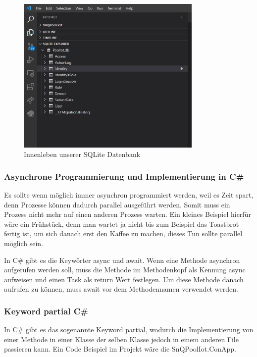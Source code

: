 \begin{figure}[H]
    \centering
    \includegraphics[width=0.8\textwidth]{./pics/SQLiteDatabaseStructure.JPG}
    \caption{Innenleben unserer SQLite Datenbank}
\end{figure}



\subsubsection*{Asynchrone Programmierung und Implementierung in C\#}
Es sollte wenn möglich immer asynchron programmiert werden, weil es Zeit spart, denn Prozesse können dadurch parallel ausgeführt werden.
Somit muss ein Prozess nicht mehr auf einen anderen Prozess warten.
Ein kleines Beispiel hierfür wäre ein Frühstück, denn man wartet ja nicht bis zum Beispiel das Toastbrot fertig ist, um sich danach erst den Kaffee zu machen, dieses Tun sollte parallel möglich sein.

In C\# gibt es die Keywörter async und await. Wenn eine Methode asynchron aufgerufen werden soll, muss die Methode im Methodenkopf als Kennung async aufweisen und einen Task als return Wert festlegen.
Um diese Methode danach aufrufen zu können, muss await vor dem Methodennamen verwendet werden.


\subsubsection*{Keyword partial C\#}
In C\# gibt es das sogenannte Keyword partial, wodurch die Implementierung von einer Methode in einer Klasse der selben Klasse jedoch in einem anderen File passieren kann.
Ein Code Beispiel im Projekt wäre die SnQPoolIot.ConApp.

